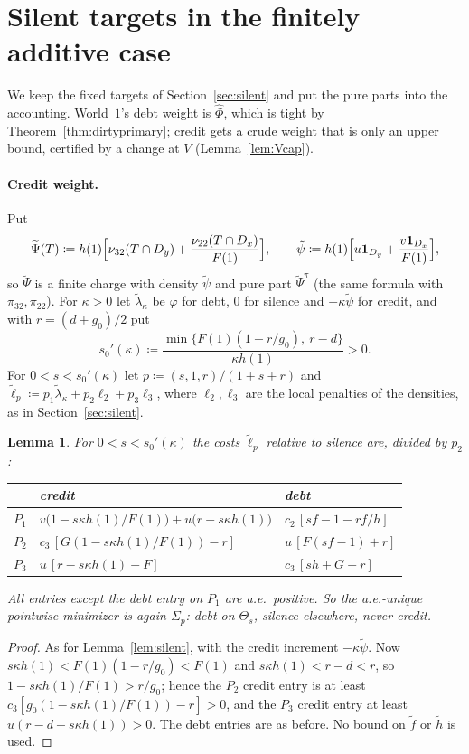 \documentclass[11pt]{article}
\newtheorem{lemma}[theorem]{Lemma}
\theoremstyle{definition}\newtheorem{definition}[theorem]{Definition}
\theoremstyle{remark}\newtheorem{remark}[theorem]{Remark}
\newcommand{\Phihat}{\widehat\Phi}
\newcommand{\Psitil}{\widetilde\Psi}
\newcommand{\psitil}{\tilde\psi}
\newcommand{\ftil}{\tilde f}
\newcommand{\htil}{\tilde h}
\newcommand{\one}{\mathbf 1}
\begin{document}
\section{Silent targets in the finitely additive case}\label{sec:silentfa}

We keep the fixed targets of Section~\ref{sec:silent} and put the pure parts
into the accounting. World~$1$'s debt weight is $\Phihat$, which is tight by
Theorem~\ref{thm:dirtyprimary}; credit gets a crude weight that is only an
upper bound, certified by a change at $V$ (Lemma~\ref{lem:Vcap}).

\paragraph{Credit weight.} Put
\[
 \Psitil(T)\coloneqq h(1)\Bigl[\nu_{32}(T\cap D_y)+\frac{\nu_{22}(T\cap
 D_x)}{F(1)}\Bigr],\qquad
 \psitil\coloneqq h(1)\Bigl[u\one_{D_y}+\frac{v\one_{D_x}}{F(1)}\Bigr],
\]
so $\Psitil$ is a finite charge with density $\psitil$ and pure part
$\Psitil^\pi$ (the same formula with $\pi_{32},\pi_{22}$). For $\kappa>0$ let
$\tilde\lambda_\kappa$ be $\varphi$ for debt, $0$ for silence and
$-\kappa\psitil$ for credit, and with $r=(d+g_0)/2$ put
\[
 s_0'(\kappa)\coloneqq\frac{\min\{F(1)(1-r/g_0),\ r-d\}}{\kappa h(1)}>0 .
\]
For $0<s<s_0'(\kappa)$ let $p\coloneqq(s,1,r)/(1+s+r)$ and
$\tilde\ell_p\coloneqq p_1\tilde\lambda_\kappa+p_2\ell_2+p_3\ell_3$, where
$\ell_2,\ell_3$ are the local penalties of the densities, as in
Section~\ref{sec:silent}.

\begin{lemma}\label{lem:silentfa}
For $0<s<s_0'(\kappa)$ the costs $\tilde\ell_p$ relative to silence are,
divided by $p_2$:
\begin{center}
\begin{tabular}{c|l|l}
 & credit & debt\\\hline
$P_1$ & $v\bigl(1-s\kappa h(1)/F(1)\bigr)+u\bigl(r-s\kappa h(1)\bigr)$ &
$c_2\,[sf-1-rf/h]$\\
$P_2$ & $c_3\,[G(1-s\kappa h(1)/F(1))-r]$ & $u\,[F(sf-1)+r]$\\
$P_3$ & $u\,[r-s\kappa h(1)-F]$ & $c_3\,[sh+G-r]$
\end{tabular}
\end{center}
All entries except the debt entry on $P_1$ are a.e.\ positive. So the
a.e.-unique pointwise minimizer is again $\Sigma_p$: debt on $\Theta_s$,
silence elsewhere, never credit.
\end{lemma}
\begin{proof}
As for Lemma~\ref{lem:silent}, with the credit increment $-\kappa\psitil$.
Now $s\kappa h(1)<F(1)(1-r/g_0)<F(1)$ and $s\kappa h(1)<r-d<r$, so
$1-s\kappa h(1)/F(1)>r/g_0$; hence the $P_2$ credit entry is at least
$c_3[g_0(1-s\kappa h(1)/F(1))-r]>0$, and the $P_3$ credit entry at least
$u(r-d-s\kappa h(1))>0$. The debt entries are as before. No bound on
$\ftil$ or $\htil$ is used.
\end{proof}
\end{document}
